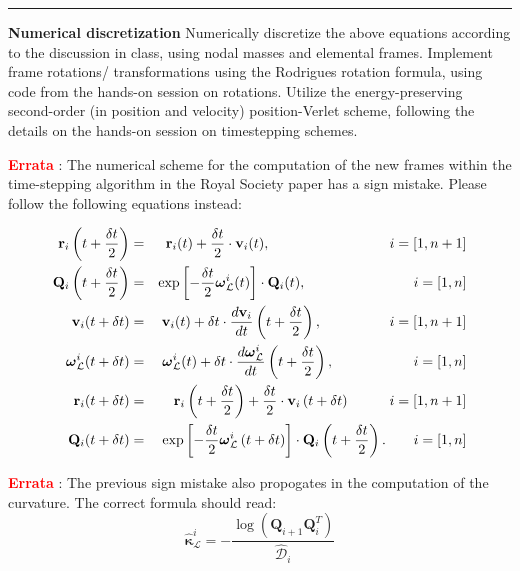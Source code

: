 \documentclass[11pt]{article}
\begin{document}
\noindent\rule{1\textwidth}{0.01pt}

\noindent \textbf{Numerical discretization}
Numerically discretize the above equations according to the discussion in
class, using nodal masses and elemental frames. Implement frame rotations/
transformations using the Rodrigues rotation formula, using code from the
hands-on session on rotations. Utilize the energy-preserving second-order
(in position and velocity) position-Verlet scheme, following the details on
the hands-on session on timestepping schemes.

\noindent \textbf{\textcolor{red}{Errata}} : The numerical scheme for the computation
of the new frames within the time-stepping algorithm in the Royal Society paper
has a sign mistake. Please follow the following equations instead:

\begin{eqnarray}
 \mathbf{r}_i\left(t+\frac{\delta t}{2}\right)&=& \mathbf{r}_i(t)+\frac{\delta t}{2}\cdot\mathbf{v}_i(t), \hspace{3cm}i=[1,n+1]\label{eq:xupdate1}\\
 \mathbf{Q}_i\left(t+\frac{\delta t}{2}\right)&=& \exp{\left[-\frac{\delta t}{2}\boldsymbol{\omega}^i_{\mathcal{L}}(t)\right]}\cdot \mathbf{Q}_i(t),\hspace{2.7cm}i=[1,n]\label{eq:qupdate1}\\
 \mathbf{v}_i(t+\delta t)&=& \mathbf{v}_i(t)+\delta t\cdot\frac{d\mathbf{v}_i}{d t}\left(t+\frac{\delta t}{2}\right), \hspace{1.7cm}i=[1,n+1]\\
 \boldsymbol{\omega}^i_{\mathcal{L}}(t+\delta t)&=& \boldsymbol{\omega}^i_{\mathcal{L}}(t)+\delta t \cdot \frac{d \boldsymbol{\omega}^i_{\mathcal{L}}}{d t}\left(t+\frac{\delta t}{2}\right), \hspace{2cm}i=[1,n]\label{eq:accupdate}\\
 \mathbf{r}_i(t+\delta t)&=& \mathbf{r}_i\left(t+\frac{\delta t}{2}\right)+\frac{\delta t}{2}\cdot\mathbf{v}_i\left(t+\delta t\right)\label{eq:xupdate2}\hspace{1cm}i=[1,n+1]\label{eq:angaccupdate}\\
 \mathbf{Q}_i(t+\delta t)&=& \exp{\left[-\frac{\delta t}{2}\boldsymbol{\omega}^i_{\mathcal{L}}\left(t+\delta t\right)\right]}\cdot \mathbf{Q}_i\left(t+\frac{\delta t}{2}\right).\hspace{0.7cm}i=[1,n]\label{eq:qupdate2}
\end{eqnarray}

\noindent \textbf{\textcolor{red}{Errata}} : The previous sign mistake also propogates in the computation of the
curvature. The correct formula should read:
\[ \hat{\boldsymbol{\kappa}}^{i}_{\mathcal{L}}=-\frac{\log(\mathbf{Q}_{i+1}\mathbf{Q}^T_{i})}{\hat{\mathcal{D}}_i} \]
\end{document}
